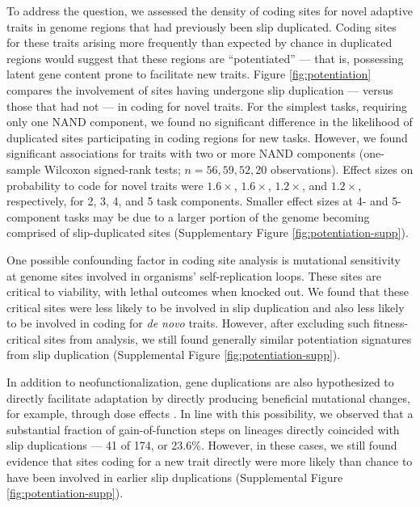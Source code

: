 To address the question, we assessed the density of coding sites for novel adaptive traits in genome regions that had previously been slip duplicated.
Coding sites for these traits arising more frequently than expected by chance in duplicated regions would suggest that these regions are ``potentiated'' --- that is, possessing latent gene content prone to facilitate new traits.
Figure \ref{fig:potentiation} compares the involvement of sites having undergone slip duplication --- versus those that had not --- in coding for novel traits.
For the simplest tasks, requiring only one NAND component, we found no significant difference in the likelihood of duplicated sites participating in coding regions for new tasks.
However, we found significant associations for traits with two or more NAND components (one-sample Wilcoxon signed-rank tests; $n=56,59,52,20$ observations).
Effect sizes on probability to code for novel traits were $1.6\times$, $1.6\times$, $1.2\times$, and $1.2\times$, respectively, for 2, 3, 4, and 5 task components.
Smaller effect sizes at 4- and 5-component tasks may be due to a larger portion of the genome becoming comprised of slip-duplicated sites (Supplementary Figure \ref{fig:potentiation-supp}).

One possible confounding factor in coding site analysis is mutational sensitivity at genome sites involved in organisms' self-replication loops.
These sites are critical to viability, with lethal outcomes when knocked out.
We found that these critical sites were less likely to be involved in slip duplication and also less likely to be involved in coding for \textit{de novo} traits.
However, after excluding such fitness-critical sites from analysis, we still found generally similar potentiation signatures from slip duplication (Supplemental Figure \ref{fig:potentiation-supp}).

In addition to neofunctionalization, gene duplications are also hypothesized to directly facilitate adaptation by directly producing beneficial mutational changes, for example, through dose effects \citep{kondrashov2012gene}.
In line with this possibility, we observed that a substantial fraction of gain-of-function steps on lineages directly coincided with slip duplications --- 41 of 174, or 23.6\%.
However, in these cases, we still found evidence that sites coding for a new trait directly were more likely than chance to have been involved in earlier slip duplications (Supplemental Figure \ref{fig:potentiation-supp}).

